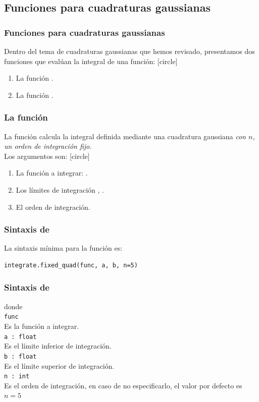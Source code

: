 \subsection{Funciones para cuadraturas gaussianas}
\begin{frame}[fragile]
\frametitle{Funciones para cuadraturas gaussianas}
Dentro del tema de cuadraturas gaussianas que hemos revisado, presentamos dos funciones que evalúan la integral de una función:
[circle]
\begin{enumerate}[<+->]
\item La función .
\item La función .
\end{enumerate}
\end{frame}
\begin{frame}
\frametitle{La función }
La función  calcula la integral definida mediante una cuadratura gaussiana \emph{con $n$, un orden de integración fijo}.
\\
\bigskip
Los argumentos son:
[circle]
\begin{enumerate}[<+->]
\item La función a integrar: .
\item Los límites de integración , .
\item El orden  de integración.
\end{enumerate}
\end{frame}
\begin{frame}[fragile]
\frametitle{Sintaxis de }
La sintaxis mínima para la función  es:
\begin{verbatim}
integrate.fixed_quad(func, a, b, n=5)
\end{verbatim}
\end{frame}
\begin{frame}[fragile]
\frametitle{Sintaxis de }
\fontsize{12}{12}\selectfont
donde
\\
\verb|func|
\\
\medskip
Es la función a integrar.
\\
\medskip
\verb|a : float|
\\
Es el límite inferior de integración.
\\
\medskip
\verb|b : float|
\\
Es el límite superior de integración.
\\
\medskip
\verb|n : int|
\\
Es el orden de integración, en caso de no especificarlo, el valor por defecto es $n = 5$
\end{frame}
